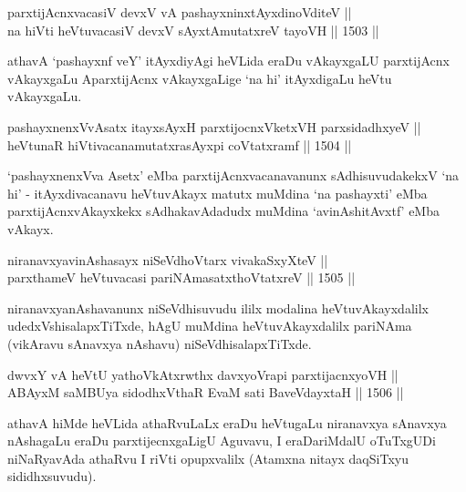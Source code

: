 
\begin{shl}
parxtijAcnxvacasiV devxV vA pashayxninxtAyxdinoVditeV || \\
na hiVti heVtuvacasiV devxV sAyxtAmutatxreV tayoVH \hfill || 1503 ||  
\end{shl}

\begin{artha}
athavA `pashayxnf veY' itAyxdiyAgi heVLida eraDu vAkayxgaLU parxtijAcnx vAkayxgaLu AparxtijAcnx vAkayxgaLige `na hi' itAyxdigaLu heVtu vAkayxgaLu.
\end{artha}


\begin{shl}
pashayxnenxVvA\s \s satx itayxsAyxH parxtijocnxVketxVH parxsidadhxyeV || \\
heVtunaR hiVtivacanamutatxrasAyxpi coVtatxramf \hfill || 1504 ||  
\end{shl}

\begin{artha}
`pashayxnenxVva Asetx' eMba parxtijAcnxvacanavanunx sAdhisuvudakekxV `na hi' - itAyxdivacanavu heVtuvAkayx matutx muMdina `na pashayxti' eMba parxtijAcnxvAkayxkekx sAdhakavAdadudx muMdina `avinAshitAvxtf' eMba vAkayx.
\end{artha}


\begin{shl}
niranavxyavinAshasayx niSeVdhoV\s tarx vivakaSxyXteV ||  \\
parxthameV heVtuvacasi pariNAmasatxthoVtatxreV \hfill || 1505 ||  
\end{shl}

\begin{artha}
niranavxyanAshavanunx niSeVdhisuvudu ililx modalina heVtuvAkayxdalilx udedxVshisalapxTiTxde, hAgU muMdina heVtuvAkayxdalilx pariNAma (vikAravu sAnavxya nAshavu) niSeVdhisalapxTiTxde.
\end{artha}


\begin{shl}
dwvxY vA heVtU yathoVkAtxrwthx davxyoVrapi parxtijacnxyoVH || \\
ABAyxM saMBUya sidodhxV\s thaR EvaM sati BaveVdayxtaH \hfill || 1506 ||  
\end{shl}

\begin{artha}
athavA hiMde heVLida athaRvuLaLx eraDu heVtugaLu niranavxya sAnavxya nAshagaLu eraDu parxtijecnxgaLigU Aguvavu, I eraDariMdalU oTuTxgUDi niNaRyavAda athaRvu I riVti opupxvalilx (Atamxna nitayx daqSiTxyu sididhxsuvudu).
\end{artha}

